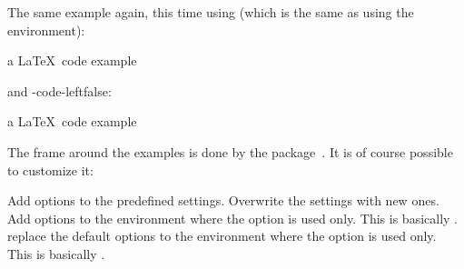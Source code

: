 \documentclass[load-preamble+]{cnltx-doc}
\begin{document}
The same example again, this time using   (which is the
same as using the  environment):

\begin{example}
  a \LaTeX\ code example
\end{example}

 and \keyis-{code-left}{false}:

\begin{example}[side-by-side,code-left=false]
  a \LaTeX\ code example
\end{example}

The frame around the examples is done by the
 package~\cite{pkg:mdframed}.  It is of course possible to
customize it:
\begin{options}
  \Default
    Add options to the predefined settings.
    Overwrite the settings with new ones.
    Add  options to the environment where the
    option is used only.  This is
    basically \beginenv*{}.
    replace the default  options to the
    environment where the option is used only.  This is
    basically \beginenv*{}.
\end{options}
\end{document}

